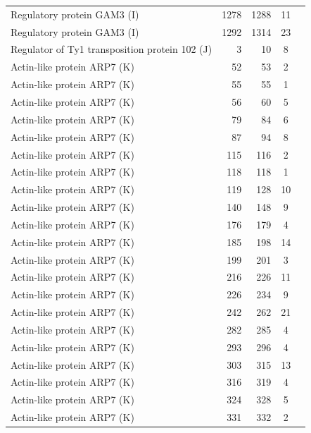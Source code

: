 \begin{longtable}{@{}p{7.5cm}rrrl@{}}
  Regulatory protein GAM3 (I) & 1278 & 1288 & \multicolumn{1}{c}{11} \\
  Regulatory protein GAM3 (I) & 1292 & 1314 & \multicolumn{1}{c}{23} \\
  Regulator of Ty1 transposition protein 102 (J) & 3 & 10 & \multicolumn{1}{c}{8} \\
  Actin-like protein ARP7 (K) & 52 & 53 & \multicolumn{1}{c}{2} \\
  Actin-like protein ARP7 (K) & 55 & 55 & \multicolumn{1}{c}{1} \\
  Actin-like protein ARP7 (K) & 56 & 60 & \multicolumn{1}{c}{5} \\
  Actin-like protein ARP7 (K) & 79 & 84 & \multicolumn{1}{c}{6} \\
  Actin-like protein ARP7 (K) & 87 & 94 & \multicolumn{1}{c}{8} \\
  Actin-like protein ARP7 (K) & 115 & 116 & \multicolumn{1}{c}{2} \\
  Actin-like protein ARP7 (K) & 118 & 118 & \multicolumn{1}{c}{1} \\
  Actin-like protein ARP7 (K) & 119 & 128 & \multicolumn{1}{c}{10} \\
  Actin-like protein ARP7 (K) & 140 & 148 & \multicolumn{1}{c}{9} \\
  Actin-like protein ARP7 (K) & 176 & 179 & \multicolumn{1}{c}{4} \\
  Actin-like protein ARP7 (K) & 185 & 198 & \multicolumn{1}{c}{14} \\
  Actin-like protein ARP7 (K) & 199 & 201 & \multicolumn{1}{c}{3} \\
  Actin-like protein ARP7 (K) & 216 & 226 & \multicolumn{1}{c}{11} \\
  Actin-like protein ARP7 (K) & 226 & 234 & \multicolumn{1}{c}{9} \\
  Actin-like protein ARP7 (K) & 242 & 262 & \multicolumn{1}{c}{21} \\
  Actin-like protein ARP7 (K) & 282 & 285 & \multicolumn{1}{c}{4} \\
  Actin-like protein ARP7 (K) & 293 & 296 & \multicolumn{1}{c}{4} \\
  Actin-like protein ARP7 (K) & 303 & 315 & \multicolumn{1}{c}{13} \\
  Actin-like protein ARP7 (K) & 316 & 319 & \multicolumn{1}{c}{4} \\
  Actin-like protein ARP7 (K) & 324 & 328 & \multicolumn{1}{c}{5} \\
  Actin-like protein ARP7 (K) & 331 & 332 & \multicolumn{1}{c}{2} \\

\end{longtable}
